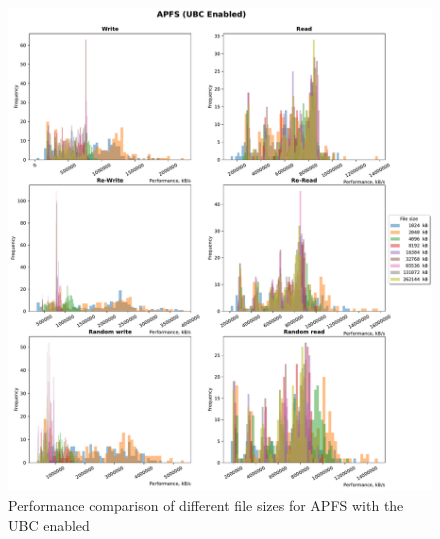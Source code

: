 \begin{figure}[!htb]
	\label{fig:bench_apfs_with_cache}
	\begin{center}
		\includegraphics[width=1.0\textwidth]{figures.nosync/benchmarking/APFS/APFS-UBC Enabled-hist.pdf}
	\end{center}
	\caption{Performance comparison of different file sizes for APFS with the UBC enabled}
\end{figure}

